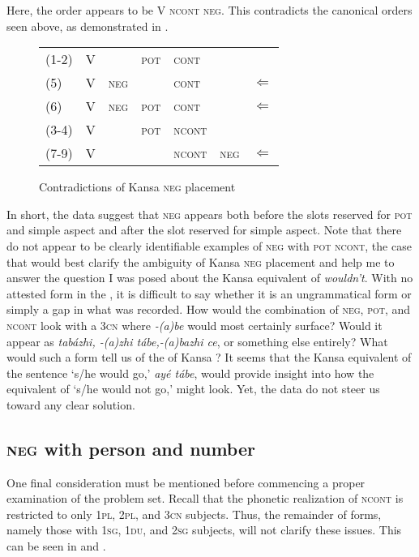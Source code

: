 \documentclass[output=paper]{LSP/langsci}
\begin{document}
Here, the order appears to be V \textsc{ncont neg}. This contradicts the canonical orders seen above, as demonstrated in .

\begin{figure}
\caption{Contradictions of Kansa \textsc{neg} placement} \label{contradictions}
\begin{tabular}{ l l l l l l l }
(1-2) & V & & \textsc{pot} & \textsc{cont} & & \\
(5) & V & \textsc{neg} & & \textsc{cont} & & $\Leftarrow$ \\
(6) & V & \textsc{neg} & \textsc{pot} & \textsc{cont} & & $\Leftarrow$ \\
(3-4) & V & & \textsc{pot} & \textsc{ncont} & & \\
(7-9) & V & & & \textsc{ncont} & \textsc{neg} & $\Leftarrow$ \\
\end{tabular}
\end{figure}

In short, the data suggest that \textsc{neg} appears both before the slots reserved for \textsc{pot} and simple aspect and after the slot reserved for simple aspect. Note that there do not appear to be clearly identifiable examples of \textsc{neg} with \textsc{pot ncont}, the case that would best clarify the ambiguity of Kansa \textsc{neg} placement and help me to answer the question I was posed about the Kansa equivalent of \textit{wouldn't}. With no attested form in the , it is difficult to say whether it is an ungrammatical form or simply a gap in what was recorded. How would the combination of \textsc{neg}, \textsc{pot}, and \textsc{ncont} look with a \textsc{3cn}  where \textit{-(a)be} would most certainly surface? Would it appear as \textit{tabázhi, -(a)zhi tábe,-(a)bazhi ce}, or something else entirely? What would such a form tell us of the  of Kansa ? It seems that the Kansa equivalent of the  sentence `s/he would go,' \textit{ay\'e tábe}, would provide insight into how the equivalent of `s/he would not go,' might look. Yet, the data do not steer us toward any clear solution.

\subsection{\textsc{neg} with person and number}
One final consideration must be mentioned before commencing a proper examination of the problem set. Recall that the phonetic realization of \textsc{ncont} is restricted to only \textsc{1pl, 2pl}, and \textsc{3cn} subjects. Thus, the remainder of forms, namely those with \textsc{1sg, 1du}, and \textsc{2sg} subjects, will not clarify these issues. This can be seen in  and .
\end{document}
